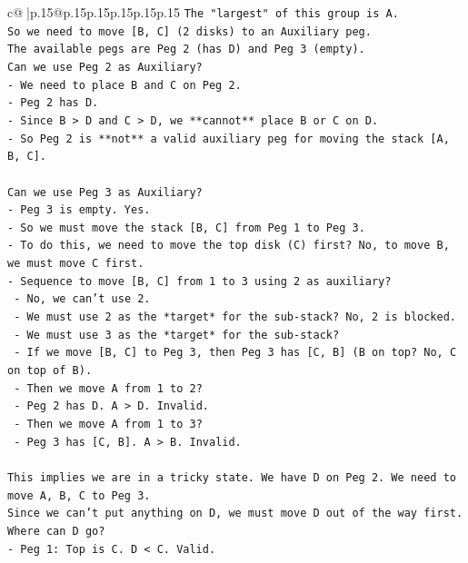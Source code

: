 \documentclass{article}
\begin{document}
{\begin{supertabular}{c@{$\;$}|p{.15\linewidth}@{}p{.15\linewidth}p{.15\linewidth}p{.15\linewidth}p{.15\linewidth}p{.15\linewidth}}
{{{\texttt{The "largest" of this group is A.} \\
\texttt{So we need to move {[}B, C{]} (2 disks) to an Auxiliary peg.} \\
\texttt{The available pegs are Peg 2 (has D) and Peg 3 (empty).} \\
\texttt{Can we use Peg 2 as Auxiliary?} \\
\texttt{{-} We need to place B and C on Peg 2.} \\
\texttt{{-} Peg 2 has D.} \\
\texttt{{-} Since B > D and C > D, we **cannot** place B or C on D.} \\
\texttt{{-} So Peg 2 is **not** a valid auxiliary peg for moving the stack {[}A, B, C{]}.} \\
\\ 
\texttt{Can we use Peg 3 as Auxiliary?} \\
\texttt{{-} Peg 3 is empty. Yes.} \\
\texttt{{-} So we must move the stack {[}B, C{]} from Peg 1 to Peg 3.} \\
\texttt{{-} To do this, we need to move the top disk (C) first? No, to move B, we must move C first.} \\
\texttt{{-} Sequence to move {[}B, C{]} from 1 to 3 using 2 as auxiliary?} \\
\texttt{  {-} No, we can't use 2.} \\
\texttt{  {-} We must use 2 as the *target* for the sub{-}stack? No, 2 is blocked.} \\
\texttt{  {-} We must use 3 as the *target* for the sub{-}stack?} \\
\texttt{  {-} If we move {[}B, C{]} to Peg 3, then Peg 3 has {[}C, B{]} (B on top? No, C on top of B).} \\
\texttt{  {-} Then we move A from 1 to 2?} \\
\texttt{    {-} Peg 2 has D. A > D. Invalid.} \\
\texttt{  {-} Then we move A from 1 to 3?} \\
\texttt{    {-} Peg 3 has {[}C, B{]}. A > B. Invalid.} \\
\\ 
\texttt{This implies we are in a tricky state. We have D on Peg 2. We need to move A, B, C to Peg 3.} \\
\texttt{Since we can't put anything on D, we must move D out of the way first.} \\
\texttt{Where can D go?} \\
\texttt{{-} Peg 1: Top is C. D < C. Valid.} \\
}}}
\end{supertabular}}
\end{document}
